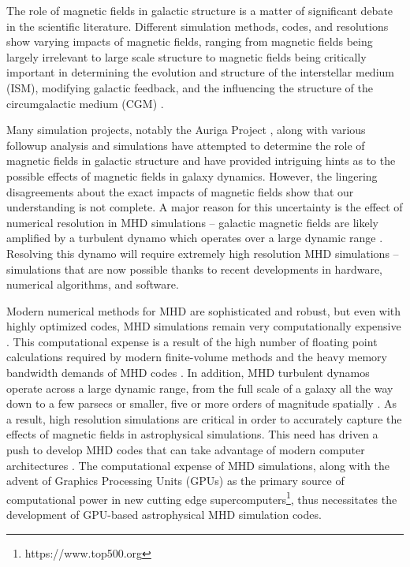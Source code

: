 The role of magnetic fields in galactic structure is a matter of significant debate in the scientific literature. Different simulation methods, codes, and resolutions show varying impacts of magnetic fields, ranging from magnetic fields being largely irrelevant to large scale structure to magnetic fields being critically important in determining the evolution and structure of the interstellar medium (ISM), modifying galactic feedback, and the influencing the structure of the circumgalactic medium (CGM) \citep{banda_2016, pakmor_magnetic_2017, naab_2017, pakmor_faraday_2018, pakmor_magnetizing_2020, ntormousi_dynamo_2020, wibking_2021, van_de_voort_effect_2021}.

Many simulation projects, notably the Auriga Project \citep{grand_auriga_2017}, along with various followup analysis and simulations \citep{pakmor_faraday_2018,pakmor_simulations_2013,pakmor_magnetic_2017,pakmor_magnetizing_2020,ntormousi_dynamo_2020, hopkins_but_2020, van_de_voort_effect_2021} have attempted to determine the role of magnetic fields in galactic structure and have provided intriguing hints as to the possible effects of magnetic fields in galaxy dynamics. However, the lingering disagreements about the exact impacts of magnetic fields show that our understanding is not complete. A major reason for this uncertainty is the effect of numerical resolution in MHD simulations -- galactic magnetic fields are likely amplified by a turbulent dynamo which operates over a large dynamic range \citep{beck_1996, carteret_2022, brandenburg_2022}. Resolving this dynamo will require extremely high resolution MHD simulations -- simulations that are now possible thanks to recent developments in hardware, numerical algorithms, and software.

Modern numerical methods for MHD are sophisticated and robust, but even with highly optimized codes, MHD simulations remain very computationally expensive \citep{athena++_2020}. This computational expense is a result of the high number of floating point calculations required by modern finite-volume methods and the heavy memory bandwidth demands of MHD codes \citep{k_athena_2021}. In addition, MHD turbulent dynamos operate across a large dynamic range, from the full scale of a galaxy all the way down to a few parsecs or smaller, five or more orders of magnitude spatially \citep{ galishnikova_tearing_2022}. As a result, high resolution simulations are critical in order to accurately capture the effects of magnetic fields in astrophysical simulations. This need has driven a push to develop MHD codes that can take advantage of modern computer architectures \citep[e.g.][]{schive_gamer-2_2018, almgren_castro_2020, zingale_castro_2020, shankar_gram-x_2022, liska_h-amr_2022, begue_cuharm_2023, holmen_early_2023}. The computational expense of MHD simulations, along with the advent of Graphics Processing Units (GPUs) as the primary source of computational power in new cutting edge supercomputers\footnote{https://www.top500.org}, thus necessitates the development of GPU-based astrophysical MHD simulation codes. 

